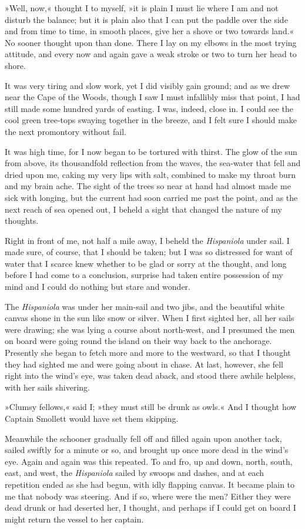 »Well, now,« thought I to myself, »it is plain I must lie where I am and not disturb the balance; but it is plain also that I can put the paddle over the side and from time to time, in smooth places, give her a shove or two towards land.« No sooner thought upon than done. There I lay on my elbows in the most trying attitude, and every now and again gave a weak stroke or two to turn her head to shore.

It was very tiring and slow work, yet I did visibly gain ground; and as we drew near the Cape of the Woods, though I saw I must infallibly miss that point, I had still made some hundred yards of easting. I was, indeed, close in. I could see the cool green tree-tops swaying together in the breeze, and I felt sure I should make the next promontory without fail.

It was high time, for I now began to be tortured with thirst. The glow of the sun from above, its thousandfold reflection from the waves, the sea-water that fell and dried upon me, caking my very lips with salt, combined to make my throat burn and my brain ache. The sight of the trees so near at hand had almost made me sick with longing, but the current had soon carried me past the point, and as the next reach of sea opened out, I beheld a sight that changed the nature of my thoughts.

Right in front of me, not half a mile away, I beheld the \textit{Hispaniola} under sail. I made sure, of course, that I should be taken; but I was so distressed for want of water that I scarce knew whether to be glad or sorry at the thought, and long before I had come to a conclusion, surprise had taken entire possession of my mind and I could do nothing but stare and wonder.

The \textit{Hispaniola} was under her main-sail and two jibs, and the beautiful white canvas shone in the sun like snow or silver. When I first sighted her, all her sails were drawing; she was lying a course about north-west, and I presumed the men on board were going round the island on their way back to the anchorage. Presently she began to fetch more and more to the westward, so that I thought they had sighted me and were going about in chase. At last, however, she fell right into the wind's eye, was taken dead aback, and stood there awhile helpless, with her sails shivering.

»Clumsy fellows,« said I; »they must still be drunk as owls.« And I thought how Captain Smollett would have set them skipping.

Meanwhile the schooner gradually fell off and filled again upon another tack, sailed swiftly for a minute or so, and brought up once more dead in the wind's eye. Again and again was this repeated. To and fro, up and down, north, south, east, and west, the \textit{Hispaniola} sailed by swoops and dashes, and at each repetition ended as she had begun, with idly flapping canvas. It became plain to me that nobody was steering. And if so, where were the men? Either they were dead drunk or had deserted her, I thought, and perhaps if I could get on board I might return the vessel to her captain.

